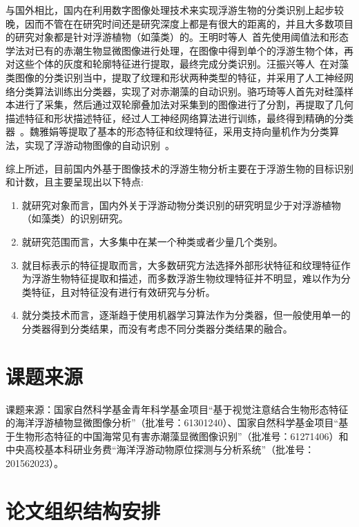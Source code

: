 与国外相比，国内在利用数字图像处理技术来实现浮游生物的分类识别上起步较晚，因而不管在在研究时间还是研究深度上都是有很大的距离的，并且大多数项目的研究对象都是针对浮游植物（如藻类）的。王明时等人~\cite{王明时2004显微图像分析技术在赤潮生物识别中的应用}首先使用阈值法和形态学法对已有的赤潮生物显微图像进行处理，在图像中得到单个的浮游生物个体，再对这些个体的灰度和轮廓特征进行提取，最终完成分类识别。汪振兴等人~\cite{汪振兴2007赤潮藻类图像自动识别的研究}在对藻类图像的分类识别当中，提取了纹理和形状两种类型的特征，并采用了人工神经网络分类算法训练出分类器，实现了对赤潮藻的自动识别。骆巧琦等人首先对硅藻样本进行了采集，然后通过双轮廓叠加法对采集到的图像进行了分割，再提取了几何描述特征和形状描述特征，经过人工神经网络算法进行训练，最终得到精确的分类器~\cite{骆巧琦2011基于形状特征的硅藻显微图像自动识别}。魏雅娟等提取了基本的形态特征和纹理特征，采用支持向量机作为分类算法，实现了浮游动物图像的自动识别~\cite{魏雅娟2013暗视场浮游动物图像自动识别方法研究}。

综上所述，目前国内外基于图像技术的浮游生物分析主要在于浮游生物的目标识别和计数，且主要呈现出以下特点:

\begin{enumerate}
\item 就研究对象而言，国内外关于浮游动物分类识别的研究明显少于对浮游植物（如藻类）的识别研究。

\item 就研究范围而言，大多集中在某一个种类或者少量几个类别。

\item 就目标表示的特征提取而言，大多数研究方法选择外部形状特征和纹理特征作为浮游生物特征提取和描述，而多数浮游生物纹理特征并不明显，难以作为分类特征，且对特征没有进行有效研究与分析。

\item 就分类技术而言，逐渐趋于使用机器学习算法作为分类器，但一般使用单一的分类器得到分类结果，而没有考虑不同分类器分类结果的融合。
\end{enumerate}

\section{课题来源}

课题来源：国家自然科学基金青年科学基金项目“基于视觉注意结合生物形态特征的海洋浮游植物显微图像分析”（批准号：61301240）、国家自然科学基金项目“基于生物形态特征的中国海常见有害赤潮藻显微图像识别”（批准号：61271406）和中央高校基本科研业务费“海洋浮游动物原位探测与分析系统”（批准号：201562023）。

\section{论文组织结构安排}

